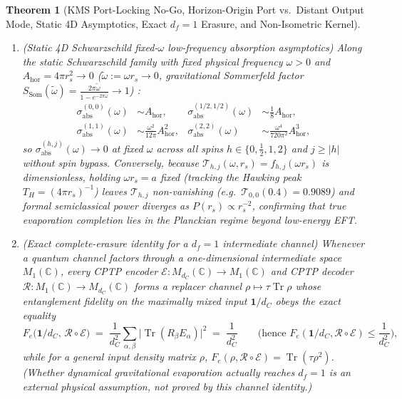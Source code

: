 \documentclass[11pt,a4paper]{article}
\newtheorem{theorem}{Theorem}
\theoremstyle{definition}
\theoremstyle{remark}
\newcommand{\Tr}{\operatorname{Tr}}
\newcommand{\cE}{\mathcal{E}}
\newcommand{\cR}{\mathcal{R}}
\newcommand{\cT}{\mathcal{T}}
\newcommand{\bbC}{\mathbb{C}}
\newcommand{\1}{\mathbf{1}}
\begin{document}
\begin{theorem}[KMS Port-Locking No-Go, Horizon-Origin Port vs.\ Distant Output Mode, Static 4D Asymptotics, Exact $d_f=1$ Erasure, and Non-Isometric Kernel]
\begin{enumerate}
\begin{enumerate}
    \item[(ii)] \emph{(Static 4D Schwarzschild fixed-$\omega$ low-frequency absorption asymptotics)} Along the static Schwarzschild family with \emph{fixed} physical frequency $\omega>0$ and $A_{\mathrm{hor}}=4\pi r_s^2\to 0$ ($\tilde{\omega}:=\omega r_s\to 0$, gravitational Sommerfeld factor $S_{\mathrm{Som}}(\tilde{\omega})=\frac{2\pi\tilde{\omega}}{1-e^{-2\pi\tilde{\omega}}}\to 1$) \cite{Unruh1976Abs,Page1976,DasGibbonsMathur1997,GoldbergerRothstein2006,Crispino2007}:
    \begin{equation}\label{eq:all-spin-closure}
      \begin{aligned}
        \sigma_{\mathrm{abs}}^{(0,0)}(\omega) &\sim A_{\mathrm{hor}}, &
        \sigma_{\mathrm{abs}}^{(1/2,1/2)}(\omega) &\sim \tfrac{1}{8} A_{\mathrm{hor}}, \\
        \sigma_{\mathrm{abs}}^{(1,1)}(\omega) &\sim \tfrac{\omega^2}{12\pi} A_{\mathrm{hor}}^2, &
        \sigma_{\mathrm{abs}}^{(2,2)}(\omega) &\sim \tfrac{\omega^4}{720\pi^2} A_{\mathrm{hor}}^3,
      \end{aligned}
    \end{equation}
    so $\sigma_{\mathrm{abs}}^{(h,j)}(\omega)\to 0$ at fixed $\omega$ across all spins $h\in\{0,\frac{1}{2},1,2\}$ and $j\ge|h|$ without spin bypass. Conversely, because $\cT_{h,j}(\omega,r_s)=f_{h,j}(\omega r_s)$ is dimensionless, holding $\omega r_s = a$ fixed (tracking the Hawking peak $T_H=(4\pi r_s)^{-1}$) leaves $\cT_{h,j}$ non-vanishing (e.g.\ $\cT_{0,0}(0.4)=0.9089$) and formal semiclassical power diverges as $P(r_s)\propto r_s^{-2}$, confirming that true evaporation completion lies in the Planckian regime beyond low-energy EFT.
    \item[(iii)] \emph{(Exact complete-erasure identity for a $d_f=1$ intermediate channel)} Whenever a quantum channel factors through a one-dimensional intermediate space $M_1(\bbC)$, every CPTP encoder $\cE: M_{d_C}(\bbC)\to M_1(\bbC)$ and CPTP decoder $\cR: M_1(\bbC)\to M_{d_C}(\bbC)$ forms a replacer channel $\rho\mapsto\tau\Tr\rho$ whose entanglement fidelity on the maximally mixed input $\1/d_C$ obeys the \emph{exact equality}
    \begin{equation}\label{eq:erasure-cap}
      F_e\bigl(\1/d_C,\, \cR\circ\cE\bigr) \;=\; \frac{1}{d_C^2}\sum_{\alpha,\beta}\bigl|\Tr(R_\beta E_\alpha)\bigr|^2 \;=\; \frac{1}{d_C^2}
      \qquad\text{(hence } F_e(\1/d_C, \cR\circ\cE) \le \frac{1}{d_C^2}\text{)},
    \end{equation}
    while for a general input density matrix $\rho$, $F_e(\rho, \cR\circ\cE)=\Tr(\tau\rho^2)$. (Whether dynamical gravitational evaporation actually reaches $d_f=1$ is an external physical assumption, not proved by this channel identity.)

\end{enumerate}
\end{enumerate}
\end{theorem}
\end{document}
